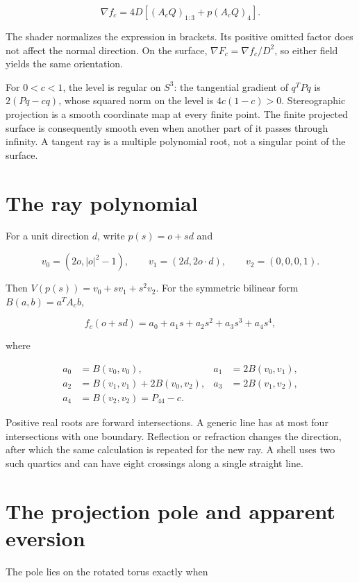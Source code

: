 \documentclass[11pt,a4paper]{article}
\begin{document}
\[
\nabla f_c=4D\left[(A_cQ)_{1:3}+p(A_cQ)_4\right].
\]

The shader normalizes the expression in brackets. Its positive omitted
factor does not affect the normal direction. On the surface,
\(\nabla F_c=\nabla f_c/D^2\), so either field yields the same
orientation.

For \(0<c<1\), the level is regular on \(S^3\): the tangential gradient
of \(q^TPq\) is \(2(Pq-cq)\), whose squared norm on the level is
\(4c(1-c)>0\). Stereographic projection is a smooth coordinate map at
every finite point. The finite projected surface is consequently smooth
even when another part of it passes through infinity. A tangent ray is a
multiple polynomial root, not a singular point of the surface.

\section{The ray polynomial}\label{the-ray-polynomial}

For a unit direction \(d\), write \(p(s)=o+s d\) and

\[
v_0=(2o,|o|^2-1),\qquad v_1=(2d,2o\cdot d),\qquad v_2=(0,0,0,1).
\]

Then \(V(p(s))=v_0+s v_1+s^2v_2\). For the symmetric bilinear form
\(B(a,b)=a^TA_cb\),

\[
f_c(o+s d)=a_0+a_1s+a_2s^2+a_3s^3+a_4s^4,
\]

where

\[
\begin{aligned}
a_0&=B(v_0,v_0), & a_1&=2B(v_0,v_1),\\
a_2&=B(v_1,v_1)+2B(v_0,v_2), & a_3&=2B(v_1,v_2),\\
a_4&=B(v_2,v_2)=P_{44}-c.
\end{aligned}
\]

Positive real roots are forward intersections. A generic line has at
most four intersections with one boundary. Reflection or refraction
changes the direction, after which the same calculation is repeated for
the new ray. A shell uses two such quartics and can have eight crossings
along a single straight line.

\section{The projection pole and apparent
eversion}\label{the-projection-pole-and-apparent-eversion}

The pole lies on the rotated torus exactly when
\end{document}
